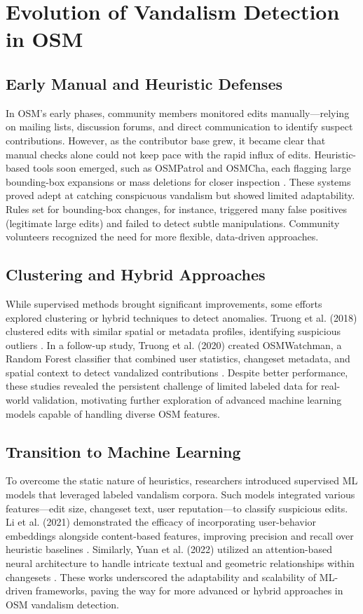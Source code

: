 \documentclass[
    13pt, %
    a4paper, %
    DIV14, %
    listof=totoc, %
    bibliography=totoc, %
    index=totoc, %
    headsepline
]{scrreprt}
\begin{document}
\section{Evolution of Vandalism Detection in OSM}
\label{sec:evolution_osm_vandalism}

\subsection{Early Manual and Heuristic Defenses}
In OSM’s early phases, community members monitored edits manually—relying on mailing lists, discussion forums, and direct communication to identify suspect contributions. However, as the contributor base grew, it became clear that manual checks alone could not keep pace with the rapid influx of edits. Heuristic-based tools soon emerged, such as OSMPatrol and OSMCha, each flagging large bounding-box expansions or mass deletions for closer inspection \cite{OSMPatrol, OSMCha, Neis2012}. These systems proved adept at catching conspicuous vandalism but showed limited adaptability. Rules set for bounding-box changes, for instance, triggered many false positives (legitimate large edits) and failed to detect subtle manipulations. Community volunteers recognized the need for more flexible, data-driven approaches.

\subsection{Clustering and Hybrid Approaches}
While supervised methods brought significant improvements, some efforts explored clustering or hybrid techniques to detect anomalies. Truong et al. (2018) clustered edits with similar spatial or metadata profiles, identifying suspicious outliers \cite{Truong2018}. In a follow-up study, Truong et al. (2020) created OSMWatchman, a Random Forest classifier that combined user statistics, changeset metadata, and spatial context to detect vandalized contributions \cite{Truong2020}. Despite better performance, these studies revealed the persistent challenge of limited labeled data for real-world validation, motivating further exploration of advanced machine learning models capable of handling diverse OSM features.

\subsection{Transition to Machine Learning}

To overcome the static nature of heuristics, researchers introduced supervised ML models that leveraged labeled vandalism corpora. Such models integrated various features—edit size, changeset text, user reputation—to classify suspicious edits. Li et al. (2021) demonstrated the efficacy of incorporating user-behavior embeddings alongside content-based features, improving precision and recall over heuristic baselines \cite{Li2021}. Similarly, Yuan et al. (2022) utilized an attention-based neural architecture to handle intricate textual and geometric relationships within changesets \cite{Yuan2022}. These works underscored the adaptability and scalability of ML-driven frameworks, paving the way for more advanced or hybrid approaches in OSM vandalism detection.
\end{document}

